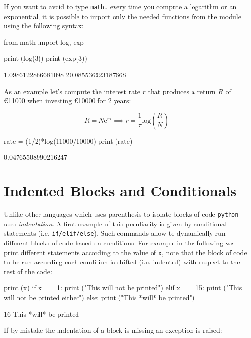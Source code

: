If you want to avoid to type \texttt{math.} every time you compute a logarithm or an exponential, 
it is possible to import only the needed functions from the module using the following syntax:

\begin{ipython}
from math import log, exp

print (log(3))
print (exp(3))
\end{ipython}
\begin{ioutput}
1.0986122886681098
20.085536923187668	
\end{ioutput}

As an example let's compute the interest rate \(r\) that produces a return \(R\) of 
\euro 11000 when investing \euro 10000 for 2 years:

\[R = N\mathrm{e}^{r\tau} \implies r = \frac{1}{\tau} \mathrm{log}(\frac{R}{N})\]

\begin{ipython}
rate = (1/2)*log(11000/10000)
print (rate)
\end{ipython}
\begin{ioutput}
0.04765508990216247	
\end{ioutput}

\section{Indented Blocks and Conditionals}
\label{indented-blocks-and-the-ttifelse-statement}

Unlike other languages which uses parenthesis to isolate blocks of code \texttt{python} uses \emph{indentation}. A first example of this peculiarity is given by conditional statements (i.e. \texttt{if/elif/else}). Such commands allow to dynamically run different blocks of code based on conditions. For example in the following we print different statements according to the value of \texttt{x}, note that the block of code to be run according each condition is shifted (i.e. indented) with respect to the rest of the code:

\begin{ipython}
print (x)
if x == 1:
	print ("This will not be printed")
elif x == 15:
	print ("This will not be printed either")
else:
	print ("This *will* be printed")
\end{ipython}
\begin{ioutput}
16
This *will* be printed	
\end{ioutput}

If by mistake the indentation of a block is missing an exception is raised:

